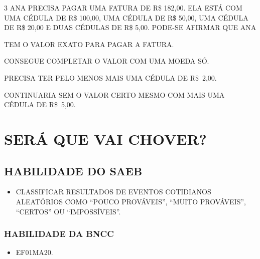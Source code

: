 \num{3} ANA PRECISA PAGAR UMA FATURA DE R\$ 182,00. ELA ESTÁ COM UMA CÉDULA DE R\$ 100,00, UMA CÉDULA DE R\$ 50,00, UMA CÉDULA DE R\$ 20,00 E DUAS CÉDULAS DE R\$ 5,00. PODE-SE AFIRMAR QUE ANA

\begin{escolha}
\item TEM O VALOR EXATO PARA PAGAR A FATURA.

\item CONSEGUE COMPLETAR O VALOR COM UMA MOEDA SÓ.

\item PRECISA TER PELO MENOS MAIS UMA CÉDULA DE R\$~2,00.

\item CONTINUARIA SEM O VALOR CERTO MESMO COM MAIS UMA CÉDULA DE R\$~5,00.
\end{escolha}



\chapter{SERÁ QUE VAI CHOVER?}


\section*{HABILIDADE DO SAEB}

\begin{itemize}
\item \uppercase{Classificar resultados de eventos cotidianos aleatórios como ``pouco
prováveis'', ``muito prováveis'', ``certos'' ou ``impossíveis''.}
\end{itemize}

\subsection{HABILIDADE DA BNCC}

\begin{itemize}
\item EF01MA20.
\end{itemize}



